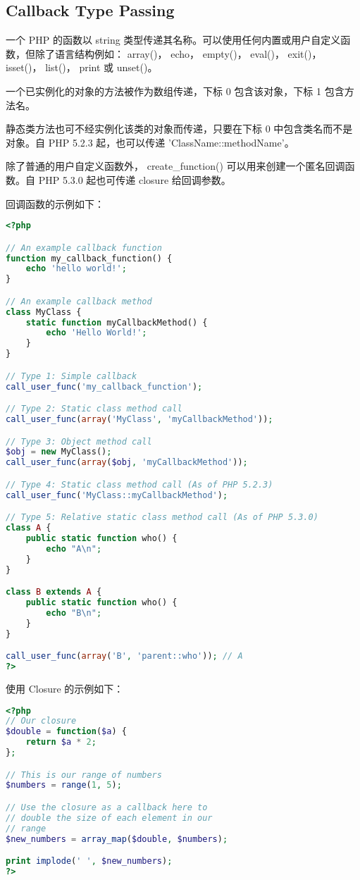 \subsection{Callback Type Passing}

一个 PHP 的函数以 string 类型传递其名称。可以使用任何内置或用户自定义函数，但除了语言结构例如： array()， echo， empty()， eval()， exit()， isset()， list()， print 或 unset()。

一个已实例化的对象的方法被作为数组传递，下标 0 包含该对象，下标 1 包含方法名。

静态类方法也可不经实例化该类的对象而传递，只要在下标 0 中包含类名而不是对象。自 PHP 5.2.3 起，也可以传递 'ClassName::methodName'。

除了普通的用户自定义函数外， create\_function() 可以用来创建一个匿名回调函数。自 PHP 5.3.0 起也可传递 closure 给回调参数。

回调函数的示例如下：

\begin{lstlisting}[language=PHP]
<?php 

// An example callback function
function my_callback_function() {
    echo 'hello world!';
}

// An example callback method
class MyClass {
    static function myCallbackMethod() {
        echo 'Hello World!';
    }
}

// Type 1: Simple callback
call_user_func('my_callback_function'); 

// Type 2: Static class method call
call_user_func(array('MyClass', 'myCallbackMethod')); 

// Type 3: Object method call
$obj = new MyClass();
call_user_func(array($obj, 'myCallbackMethod'));

// Type 4: Static class method call (As of PHP 5.2.3)
call_user_func('MyClass::myCallbackMethod');

// Type 5: Relative static class method call (As of PHP 5.3.0)
class A {
    public static function who() {
        echo "A\n";
    }
}

class B extends A {
    public static function who() {
        echo "B\n";
    }
}

call_user_func(array('B', 'parent::who')); // A
?>
\end{lstlisting}

 使用 Closure 的示例如下：
 
 
\begin{lstlisting}[language=PHP]
<?php
// Our closure
$double = function($a) {
    return $a * 2;
};

// This is our range of numbers
$numbers = range(1, 5);

// Use the closure as a callback here to 
// double the size of each element in our 
// range
$new_numbers = array_map($double, $numbers);

print implode(' ', $new_numbers);
?>
\end{lstlisting}

